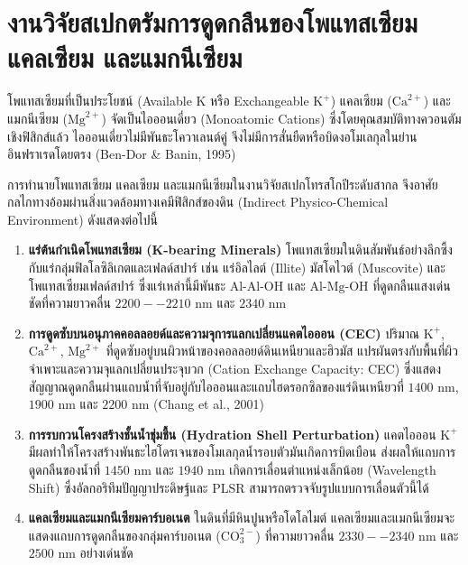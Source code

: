 \documentclass[12pt,a4paper,oneside]{book}
\begin{document}
\section{งานวิจัยสเปกตรัมการดูดกลืนของโพแทสเซียม แคลเซียม และแมกนีเซียม}
โพแทสเซียมที่เป็นประโยชน์ (Available K หรือ Exchangeable $\text{K}^+$) แคลเซียม ($\text{Ca}^{2+}$) และแมกนีเซียม ($\text{Mg}^{2+}$) จัดเป็นไอออนเดี่ยว (Monoatomic Cations) ซึ่งโดยคุณสมบัติทางควอนตัมเชิงฟิสิกส์แล้ว ไอออนเดี่ยวไม่มีพันธะโควาเลนต์คู่ จึงไม่มีการสั่นยืดหรือบิดงอโมเลกุลในย่านอินฟราเรดโดยตรง (Ben-Dor \& Banin, 1995)

การทำนายโพแทสเซียม แคลเซียม และแมกนีเซียมในงานวิจัยสเปกโทรสโกปีระดับสากล จึงอาศัยกลไกทางอ้อมผ่านสิ่งแวดล้อมทางเคมีฟิสิกส์ของดิน (Indirect Physico-Chemical Environment) ดังแสดงต่อไปนี้

\begin{enumerate}
    \item \textbf{แร่ต้นกำเนิดโพแทสเซียม (K-bearing Minerals)}
    โพแทสเซียมในดินสัมพันธ์อย่างลึกซึ้งกับแร่กลุ่มฟิลโลซิลิเกตและเฟลด์สปาร์ เช่น แร่อิลไลต์ (Illite) มัสโคไวต์ (Muscovite) และโพแทสเซียมเฟลด์สปาร์ ซึ่งแร่เหล่านี้มีพันธะ $\text{Al-Al-OH}$ และ $\text{Al-Mg-OH}$ ที่ดูดกลืนแสงเด่นชัดที่ความยาวคลื่น $2200--2210\text{ nm}$ และ $2340\text{ nm}$
    
    \item \textbf{การดูดซับบนอนุภาคคอลลอยด์และความจุการแลกเปลี่ยนแคตไอออน (CEC)}
    ปริมาณ $\text{K}^+$, $\text{Ca}^{2+}$, $\text{Mg}^{2+}$ ที่ดูดซับอยู่บนผิวหน้าของคอลลอยด์ดินเหนียวและฮิวมัส แปรผันตรงกับพื้นที่ผิวจำเพาะและความจุแลกเปลี่ยนประจุบวก (Cation Exchange Capacity: CEC) ซึ่งแสดงสัญญาณดูดกลืนผ่านแถบน้ำที่จับอยู่กับไอออนและแถบไฮดรอกซิลของแร่ดินเหนียวที่ $1400\text{ nm}$, $1900\text{ nm}$ และ $2200\text{ nm}$ (Chang et al., 2001)
    
    \item \textbf{การรบกวนโครงสร้างชั้นน้ำชุ่มชื้น (Hydration Shell Perturbation)}
    แคตไอออน $\text{K}^+$ มีผลทำให้โครงสร้างพันธะไฮโดรเจนของโมเลกุลน้ำรอบตัวมันเกิดการบิดเบือน ส่งผลให้แถบการดูดกลืนของน้ำที่ $1450\text{ nm}$ และ $1940\text{ nm}$ เกิดการเลื่อนตำแหน่งเล็กน้อย (Wavelength Shift) ซึ่งอัลกอริทึมปัญญาประดิษฐ์และ PLSR สามารถตรวจจับรูปแบบการเลื่อนตัวนี้ได้
    
    \item \textbf{แคลเซียมและแมกนีเซียมคาร์บอเนต}
    ในดินที่มีหินปูนหรือโดโลไมต์ แคลเซียมและแมกนีเซียมจะแสดงแถบการดูดกลืนของกลุ่มคาร์บอเนต ($\text{CO}_3^{2-}$) ที่ความยาวคลื่น $2330--2340\text{ nm}$ และ $2500\text{ nm}$ อย่างเด่นชัด
\end{enumerate}
\end{document}
